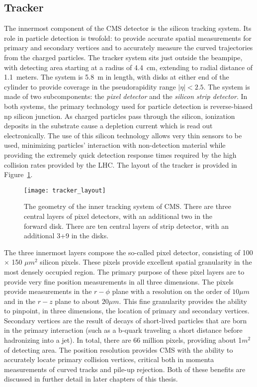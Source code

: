 \subsection{Tracker}
The innermost component of the CMS detector is the silicon tracking system. Its
role in particle detection is twofold: to provide accurate spatial measurements
for primary and secondary vertices and to accurately measure the curved
trajectories from the charged particles. The tracker system sits just outside
the beampipe, with detecting area starting at a radius of 4.4~cm, extending to
radial distance of 1.1~meters. The system is 5.8~m in length, with disks at
either end of the cylinder to provide coverage in the pseudorapidity range
$|\eta|<2.5$.  The system is made of two subcomponents: the \emph{pixel
detector} and the \emph{silicon strip detector}. In both systems, the primary
technology used for particle detection is reverse-biased np silicon junction. As
charged particles pass through the silicon, ionization deposits in the substrate
cause a depletion current which is read out electronically. The use of this
silicon technology allows very thin sensors to be used, minimizing particles'
interaction with non-detection material while providing the extremely quick
detection response times required by the high collision rates provided by the
LHC. The layout of the tracker is provided in Figure~\ref{fig:trackerLayout}.

\begin{figure}[h]
\centering
\texttt{[image: tracker\_layout]}
\caption[The geometry of the CMS tracking system.]{The geometry of the inner tracking system of CMS. There are three
central layers of pixel detectors, with an additional two in the forward disk.
There are ten central layers of strip detector, with an additional 3+9 in the
disks.}
\label{fig:trackerLayout}
\end{figure}

The three innermost layers compose the so-called pixel detector,
consisting of 100 $\times$ 150 $\mu m^2$ silicon pixels. These pixels provide
excellent spatial granularity in the most densely occupied region. The primary
purpose of these pixel layers are to provide very fine position measurements in
all three dimensions. The pixels provide measurements in the $r-\phi$ plane with
a resolution on the order of $10 \mu m$ and in the $r-z$ plane to about $20 \mu
m$.  This fine granularity provides the ability to pinpoint, in three
dimensions, the location of primary and secondary vertices. Secondary vertices
are the result of decays of short-lived particles that are born in the primary
interaction (such as a b-quark traveling a short distance before hadronizing
into a jet).  In total, there are 66 million pixels, providing about 1$m^2$ of
detecting area. The position resolution provides CMS with the ability to
accurately locate primary collision vertices, critical both in momenta
measurements of curved tracks and pile-up rejection. Both of these benefits are
discussed in further detail in later chapters of this thesis.

